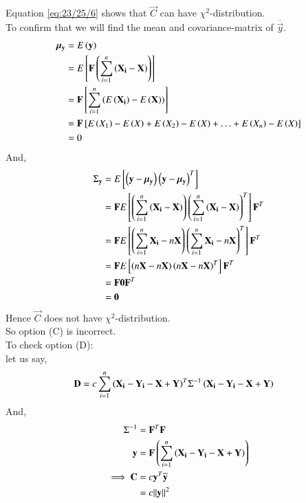 \documentclass[journal,12pt,onecolumn]{IEEEtran}
\theoremstyle{remark}
\begin{document}
Equation \eqref{eq:23/25/6} shows that $\vec{C}$ can have ${\chi}^2$-distribution. \\
To confirm that we will find the mean and covariance-matrix of $\overline{\vec{y}}$.
\begin{align}
{\bm{\mu}}_{\mathbf{y}} &= E\left(\mathbf{y}\right) \\
                     &= E{}\left[\mathbf{F}\left(\sum_{i=1}^{n}\left(\mathbf{X_i}-\mathbf{X}\right)\right)\right] \\
                     &= \mathbf{F}{}\left[\sum_{i=1}^{n}\left(E\left(\mathbf{X_i}\right)-E\left(\mathbf{X}\right)\right)\right] \\
                     &= \mathbf{F}{}\left[E\left(X_1\right)-E\left(X\right)+E\left(X_2\right)-E\left(X\right)+\ldots+E\left(X_n\right)-E\left(X\right)\right]\\
                     &= 0
\end{align}
And,
\begin{align}
{\Sigma}_{\mathbf{y}} &= E{}\left[\left(\mathbf{y}-{\bm{\mu}}_{\mathbf{y}}\right){\left(\mathbf{y}-{\bm{\mu}}_{\mathbf{y}}\right)}^T\right] \\
                   &= \mathbf{F}E{}\left[\left(\sum_{i=1}^{n}\left(\mathbf{X_i}-\mathbf{X}\right)\right){\left(\sum_{i=1}^{n}\left(\mathbf{X_i}-\mathbf{X}\right)\right)}^T\right]{\mathbf{F}}^T \\
                   &= \mathbf{F}E{}\left[\left(\sum_{i=1}^{n}\mathbf{X_i}-n\mathbf{X}\right){\left(\sum_{i=1}^{n}\mathbf{X_i}-n\mathbf{X}\right)}^T\right]{\mathbf{F}}^T \\
                   &= \mathbf{F}E{}\left[\left(n\mathbf{X}-n\mathbf{X}\right){\left(n\mathbf{X}-n\mathbf{X}\right)}^T\right]{\mathbf{F}}^T \\
                   &= \mathbf{F}\bm{0}{\mathbf{F}}^T  \\
                   &= \bm{0} 
\end{align}
Hence $\vec{C}$ does not have ${\chi}^2$-distribution.\\
So option (C) is incorrect.\\
To check option (D): \\
let us say,
\begin{align}
\mathbf{D} &= c\sum_{i=1}^n{\left(\mathbf{X_i}-\mathbf{Y_i}-\mathbf{X}+\mathbf{Y}\right)}^T{\Sigma}^{-1}\left(\mathbf{X_i}-\mathbf{Y_i}-\mathbf{X}+\mathbf{Y}\right)
\end{align}
And,
\begin{align}
{\Sigma}^{-1} &= {\mathbf{F}}^T\mathbf{F}  \\
\mathbf{y} &= \mathbf{F}\left(\sum_{i=1}^{n}\left(\mathbf{X_i}-\mathbf{Y_i}-\mathbf{X}+\mathbf{Y}\right)\right) \\
\implies \mathbf{C} &= c{\mathbf{y}}^T\overline{\mathbf{y}} \\
                 &= c{\left\lVert\mathbf{y}\right\rVert}^2  \label{eq:23/25/7}
\end{align}
\end{document}
